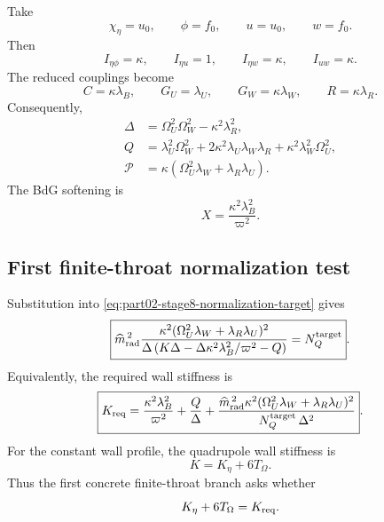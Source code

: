 Take
\begin{equation}
\chi_\eta=u_0,
\qquad
\phi=f_0,
\qquad
u=u_0,
\qquad
w=f_0.
\end{equation}
Then
\begin{equation}
I_{\eta\phi}=\kappa,
\qquad
I_{\eta u}=1,
\qquad
I_{\eta w}=\kappa,
\qquad
I_{uw}=\kappa.
\end{equation}
The reduced couplings become
\begin{equation}
\label{eq:part02-stage9-couplings}
\boxed{
C=\kappa\lambda_B,
\qquad
G_U=\lambda_U,
\qquad
G_W=\kappa\lambda_W,
\qquad
R=\kappa\lambda_R}.
\end{equation}
Consequently,
\begin{equation}
\label{eq:part02-stage9-DeltaQP}
\boxed{
\begin{aligned}
\Delta&=\Omega_U^2\Omega_W^2-\kappa^2\lambda_R^2,\\
Q&=\lambda_U^2\Omega_W^2+2\kappa^2\lambda_U\lambda_W\lambda_R+\kappa^2\lambda_W^2\Omega_U^2,\\
\mathcal P&=\kappa(\Omega_U^2\lambda_W+\lambda_R\lambda_U).
\end{aligned}
}
\end{equation}
The BdG softening is
\begin{equation}
X=\frac{\kappa^2\lambda_B^2}{\varpi^2}.
\end{equation}

\subsection{First finite-throat normalization test}
\label{subsec:part02-stage026-normalization-test}

Substitution into \eqref{eq:part02-stage8-normalization-target} gives
\begin{equation}
\label{eq:part02-stage9-normalization}
\boxed{
\widehat m_{\rm rad}^{\,2}
\frac{\kappa^2(\Omega_U^2\lambda_W+\lambda_R\lambda_U)^2}
{\Delta\left(K\Delta-\Delta\kappa^2\lambda_B^2/\varpi^2-Q\right)}
=
N_Q^{\rm target}}.
\end{equation}
Equivalently, the required wall stiffness is
\begin{equation}
\label{eq:part02-stage9-Kreq}
\boxed{
K_{\rm req}
=
\frac{\kappa^2\lambda_B^2}{\varpi^2}
+
\frac{Q}{\Delta}
+
\frac{\widehat m_{\rm rad}^{\,2}\kappa^2(\Omega_U^2\lambda_W+\lambda_R\lambda_U)^2}
{N_Q^{\rm target}\,\Delta^2}}.
\end{equation}
For the constant wall profile, the quadrupole wall stiffness is
\begin{equation}
\label{eq:part02-stage9-Kgeo}
K=K_\eta+6T_\Omega.
\end{equation}
Thus the first concrete finite-throat branch asks whether
\begin{equation}
K_\eta+6T_\Omega=K_{\rm req}.
\end{equation}

